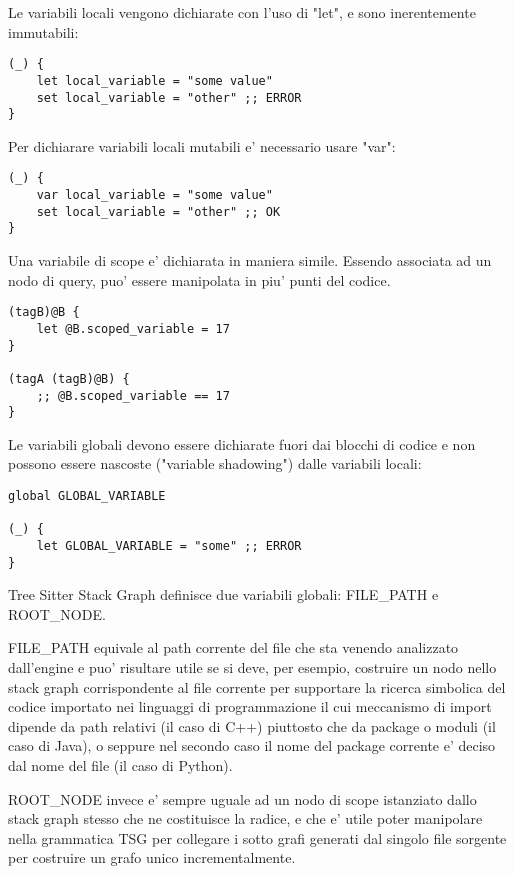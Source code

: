Le variabili locali vengono dichiarate con l'uso di "let", e sono inerentemente immutabili:

\begin{Verbatim}[samepage=true]
(_) {
    let local_variable = "some value"
    set local_variable = "other" ;; ERROR
}
\end{Verbatim}

Per dichiarare variabili locali mutabili e' necessario usare "var":

\begin{Verbatim}[samepage=true]
(_) {
    var local_variable = "some value"
    set local_variable = "other" ;; OK
}
\end{Verbatim}

Una variabile di scope e' dichiarata in maniera simile. Essendo associata ad un nodo di query, puo' essere manipolata in piu' punti del codice.

\begin{Verbatim}[samepage=true]
(tagB)@B {
    let @B.scoped_variable = 17
}

(tagA (tagB)@B) {
    ;; @B.scoped_variable == 17
}
\end{Verbatim}

Le variabili globali devono essere dichiarate fuori dai blocchi di codice e non possono essere nascoste ("variable shadowing") dalle variabili locali:

\begin{Verbatim}[samepage=true]
global GLOBAL_VARIABLE

(_) {
    let GLOBAL_VARIABLE = "some" ;; ERROR
}
\end{Verbatim}

Tree Sitter Stack Graph definisce due variabili globali: FILE\_PATH e ROOT\_NODE.

FILE\_PATH equivale al path corrente del file che sta venendo analizzato dall'engine e puo' risultare utile se si deve, per esempio, costruire un nodo nello stack graph corrispondente al file corrente per supportare la ricerca simbolica del codice importato nei linguaggi di programmazione il cui meccanismo di import dipende da path relativi (il caso di C++) piuttosto che da package o moduli (il caso di Java), o seppure nel secondo caso il nome del package corrente e' deciso dal nome del file (il caso di Python).

ROOT\_NODE invece e' sempre uguale ad un nodo di scope istanziato dallo stack graph stesso che ne costituisce la radice, e che e' utile poter manipolare nella grammatica TSG per collegare i sotto grafi generati dal singolo file sorgente per costruire un grafo unico incrementalmente.

